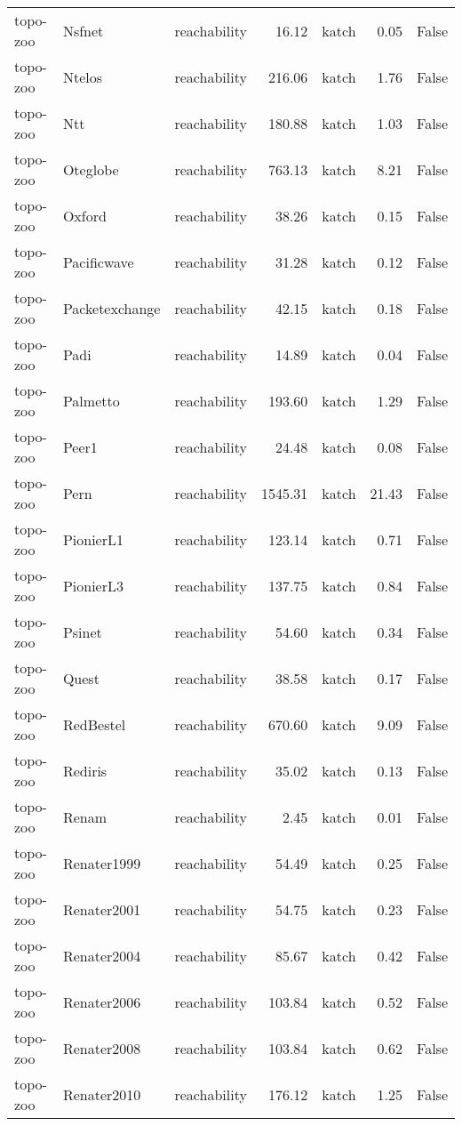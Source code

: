 \begin{tabular}{lllrlrr}
topo-zoo & Nsfnet & reachability & 16.12 & katch & 0.05 & False \\
topo-zoo & Ntelos & reachability & 216.06 & katch & 1.76 & False \\
topo-zoo & Ntt & reachability & 180.88 & katch & 1.03 & False \\
topo-zoo & Oteglobe & reachability & 763.13 & katch & 8.21 & False \\
topo-zoo & Oxford & reachability & 38.26 & katch & 0.15 & False \\
topo-zoo & Pacificwave & reachability & 31.28 & katch & 0.12 & False \\
topo-zoo & Packetexchange & reachability & 42.15 & katch & 0.18 & False \\
topo-zoo & Padi & reachability & 14.89 & katch & 0.04 & False \\
topo-zoo & Palmetto & reachability & 193.60 & katch & 1.29 & False \\
topo-zoo & Peer1 & reachability & 24.48 & katch & 0.08 & False \\
topo-zoo & Pern & reachability & 1545.31 & katch & 21.43 & False \\
topo-zoo & PionierL1 & reachability & 123.14 & katch & 0.71 & False \\
topo-zoo & PionierL3 & reachability & 137.75 & katch & 0.84 & False \\
topo-zoo & Psinet & reachability & 54.60 & katch & 0.34 & False \\
topo-zoo & Quest & reachability & 38.58 & katch & 0.17 & False \\
topo-zoo & RedBestel & reachability & 670.60 & katch & 9.09 & False \\
topo-zoo & Rediris & reachability & 35.02 & katch & 0.13 & False \\
topo-zoo & Renam & reachability & 2.45 & katch & 0.01 & False \\
topo-zoo & Renater1999 & reachability & 54.49 & katch & 0.25 & False \\
topo-zoo & Renater2001 & reachability & 54.75 & katch & 0.23 & False \\
topo-zoo & Renater2004 & reachability & 85.67 & katch & 0.42 & False \\
topo-zoo & Renater2006 & reachability & 103.84 & katch & 0.52 & False \\
topo-zoo & Renater2008 & reachability & 103.84 & katch & 0.62 & False \\
topo-zoo & Renater2010 & reachability & 176.12 & katch & 1.25 & False \\

\end{tabular}
